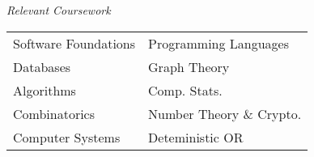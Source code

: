 {\it Relevant Coursework} \\
\begin{tabular}{l l}
Software Foundations & Programming Languages \\
Databases &  Graph Theory \\
Algorithms & Comp. Stats. \\
Combinatorics &  Number Theory \& Crypto. \\
Computer Systems &  Deteministic OR \\
\end{tabular}
